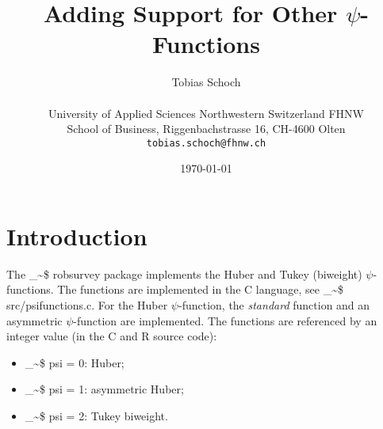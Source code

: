 \documentclass[a4paper,oneside,11pt,DIV=12]{scrartcl}
\makeatletter
\theoremstyle{remark}
\newcommand\code{\bgroup\@makeother\_\@makeother\~\@makeother\$\@makeother\^\@codex}
\def\@codex#1{{\normalfont\ttfamily\hyphenchar\font=-1 #1}\egroup}
\makeatother
\begin{document}

\title{\Large Adding Support for Other $\psi$-Functions}

\author{{\normalsize Tobias Schoch} \\
\begin{minipage}[t][][t]{\textwidth}
	\begin{center}
	\small{University of Applied Sciences Northwestern Switzerland FHNW} \\
	\small{School of Business, Riggenbachstrasse 16, CH-4600 Olten} \\
	\small{\texttt{tobias.schoch{@}fhnw.ch}}
	\end{center}
\end{minipage}}

\date{{\small \today}}
\maketitle

\renewenvironment{abstract}{%
\begin{center}\begin{minipage}{0.9\textwidth}
\rule{\textwidth}{0.4pt}
{\sffamily\bfseries\footnotesize Abstract.}\small}
{\par\noindent\rule{\textwidth}{0.4pt}\end{minipage}\end{center}}

\section{Introduction}\label{ch:introduction}
The \code{robsurvey} package implements the Huber and Tukey (biweight)
$\psi$-functions. The functions are implemented in the C language, see
\code{src/psifunctions.c}. For the Huber $\psi$-function, the \emph{standard}
function and an asymmetric $\psi$-function are implemented. The functions are
referenced by an integer value (in the C and R source code):

\begin{itemize}
    \item \code{psi = 0}: Huber;
    \item \code{psi = 1}: asymmetric Huber;
    \item \code{psi = 2}: Tukey biweight.
\end{itemize}
\end{document}
